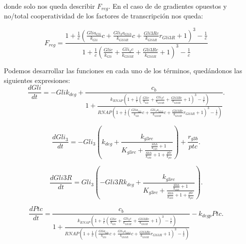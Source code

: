 donde solo nos queda describir $F_{reg}$. En el caso de de gradientes opuestos y no/total cooperatividad de los factores de transcripción nos queda:

\begin{equation}
F_{reg}=\frac{1 + \frac{1}{c} \left(\frac{Gli a_{Gli}}{k_{Gli}} c + \frac{Gli_{3} a_{Gli3}}{k_{Gli3R}} c + \frac{Gli3R c}{k_{Gli3R}} r_{Gli3R} + 1\right)^{3} - \frac{1}{c}}{1 + \frac{1}{c} \left(\frac{Gli c}{k_{Gli}} + \frac{Gli_{3} c}{k_{Gli3R}} + \frac{Gli3R c}{k_{Gli3R}} + 1\right)^{3} - \frac{1}{c}}
\end{equation}






Podemos desarrollar las funciones en cada uno de los términos, quedándonos las siguientes expresiones:
\begin{equation}
\frac{dGli}{dt}=- Gli k_{deg} + \frac{c_{b}}{1 + \frac{k_{RNAP} \left(1 + \frac{1}{c} \left(\frac{Gli c}{k_{Gli}} + \frac{Gli_{3} c}{k_{Gli3R}} + \frac{Gli3R c}{k_{Gli3R}} + 1\right)^{3} - \frac{1}{c}\right)}{RNAP \left(1 + \frac{1}{c} \left(\frac{Gli a_{Gli}}{k_{Gli}} c + \frac{Gli_{3} a_{Gli3}}{k_{Gli3R}} c + \frac{Gli3R c}{k_{Gli3R}} r_{Gli3R} + 1\right)^{3} - \frac{1}{c}\right)}}.
\end{equation}


\begin{equation}
\frac{dGli_3}{dt}=- Gli_{3} \left(k_{deg} + \frac{k_{g3rc}}{K_{g3rc} + \frac{\frac{Shh}{k_{shh}} + 1}{\frac{Shh}{k_{shh}} + 1 + \frac{ptc}{k_{ptc}}}}\right) + \frac{r_{g3b}}{ptc}.
\end{equation}

\begin{equation}
\frac{dGli3R}{dt}=Gli_{3} \left(- Gli3R k_{deg} + \frac{k_{g3rc}}{K_{g3rc} + \frac{\frac{Shh}{k_{shh}} + 1}{\frac{Shh}{k_{shh}} + 1 + \frac{ptc}{k_{ptc}}}}\right).
\end{equation}

\begin{equation}
\frac{dPtc}{dt}=\frac{c_{b}}{1 + \frac{k_{RNAP} \left(1 + \frac{1}{c} \left(\frac{Gli c}{k_{Gli}} + \frac{Gli_{3} c}{k_{Gli3R}} + \frac{Gli3R c}{k_{Gli3R}} + 1\right)^{3} - \frac{1}{c}\right)}{RNAP \left(1 + \frac{1}{c} \left(\frac{Gli a_{Gli}}{k_{Gli}} c + \frac{Gli_{3} a_{Gli3}}{k_{Gli3R}} c + \frac{Gli3R c}{k_{Gli3R}} r_{Gli3R} + 1\right)^{3} - \frac{1}{c}\right)}} - k_{deg p} Ptc.
\end{equation}




